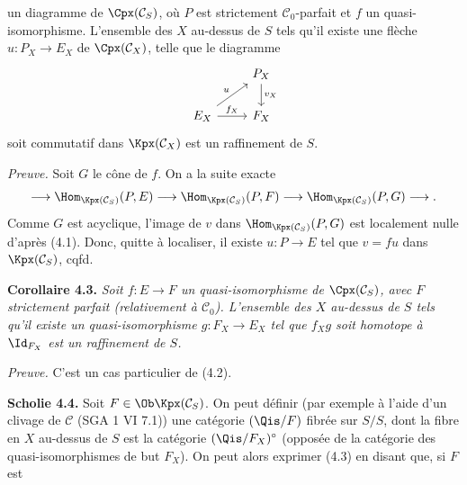 un
diagramme de \(\Cpx(\mathcal C_S)\), où \(P\) est strictement \(\mathcal C_0\)-parfait et \(f\) un quasi-isomorphisme. L'ensemble des \(X\) au-dessus de \(S\) tels qu'il existe une flèche \(u:P_X\to E_X\) de \(\Cpx(\mathcal C_X)\), telle que le diagramme
\[
\begin{tikzcd}
& P_X \arrow[d,"v_X"]\\
E_X \arrow[r,"f_X"] \arrow[ur,"u"] & F_X
\end{tikzcd}
\]
soit commutatif dans \(\Kpx(\mathcal C_X)\) est un raffinement de \(S\).

\emph{Preuve.} Soit \(G\) le cône de \(f\). On a la suite exacte
\[
  \longrightarrow \Hom_{\Kpx(\mathcal C_S)}(P,E)
  \longrightarrow \Hom_{\Kpx(\mathcal C_S)}(P,F)
  \longrightarrow \Hom_{\Kpx(\mathcal C_S)}(P,G)
  \longrightarrow .
\]
Comme \(G\) est acyclique, l'image de \(v\) dans \(\Hom_{\Kpx(\mathcal C_S)}(P,G)\) est localement nulle d'après (4.1). Donc, quitte à localiser, il existe \(u:P\to E\) tel que \(v=fu\) dans \(\Kpx(\mathcal C_S)\), cqfd.

\textbf{Corollaire 4.3.} \emph{Soit \(f:E\to F\) un quasi-isomorphisme de \(\Cpx(\mathcal C_S)\), avec \(F\) strictement parfait (relativement à \(\mathcal C_0\)). L'ensemble des \(X\) au-dessus de \(S\) tels qu'il existe un quasi-isomorphisme \(g:F_X\to E_X\) tel que \(f_Xg\) soit homotope à \(\Id_{F_X}\) est un raffinement de \(S\).}

\emph{Preuve.} C'est un cas particulier de (4.2).

\textbf{Scholie 4.4.} Soit \(F\in\Ob\Kpx(\mathcal C_S)\). On peut définir (par exemple à l'aide d'un clivage de \(\mathcal C\) (SGA 1 VI 7.1)) une catégorie \((\Qis/F)\) fibrée sur \(S/S\), dont la fibre en \(X\) au-dessus de \(S\) est la catégorie \((\Qis/F_X)^\circ\) (opposée de la catégorie des quasi-isomorphismes de but \(F_X\)). On peut alors exprimer (4.3) en disant que, si \(F\) est
